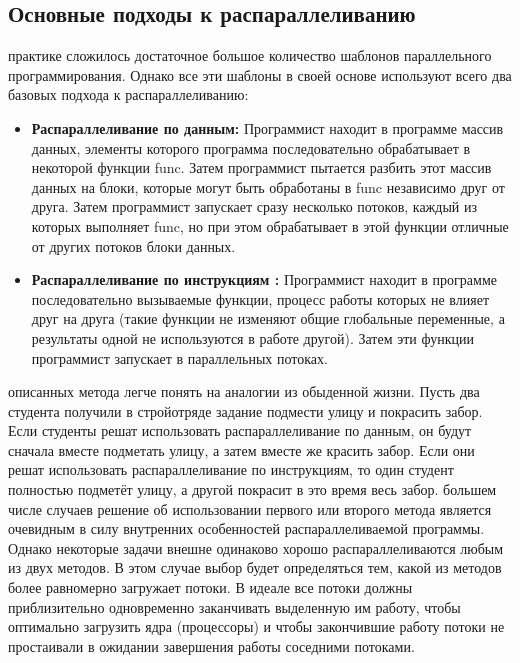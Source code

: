 { %
	\subsection{Основные подходы к распараллеливанию}
	\Large{} практике сложилось достаточное большое количество шаблонов параллельного программирования. Однако все эти шаблоны в своей основе используют всего два базовых подхода к распараллеливанию:
	\begin{itemize}
		\item\textbf{Распараллеливание по данным:} Программист находит в программе массив данных, элементы которого программа последовательно обрабатывает в некоторой функции func. Затем программист пытается разбить этот массив данных на блоки, которые могут быть обработаны в func независимо друг от друга. Затем программист запускает сразу несколько потоков, каждый из которых выполняет func, но при этом обрабатывает в этой функции отличные от других потоков блоки данных.
		\item\textbf{Распараллеливание по инструкциям :} Программист находит в программе последовательно вызываемые функции, процесс работы которых не влияет друг на друга (такие функции не изменяют общие глобальные переменные, а результаты одной не используются в работе другой). Затем эти функции программист запускает в параллельных потоках.
	\end{itemize}
	 описанных метода легче понять на аналогии из обыденной жизни. Пусть два студента получили в стройотряде задание подмести улицу и покрасить забор. Если студенты решат использовать распараллеливание по данным, он будут сначала вместе подметать улицу, а затем вместе же красить забор. Если они решат использовать распараллеливание по инструкциям, то один студент полностью подметёт улицу, а другой покрасит в это время весь забор.
	 большем числе случаев решение об использовании первого или второго метода является очевидным в силу внутренних особенностей распараллеливаемой программы. Однако некоторые задачи внешне одинаково хорошо распараллеливаются любым из двух методов. В этом случае выбор будет определяться тем, какой из методов более равномерно загружает потоки. В идеале все потоки должны приблизительно одновременно заканчивать выделенную им работу, чтобы оптимально загрузить ядра (процессоры) и чтобы закончившие работу потоки не простаивали в ожидании завершения работы соседними потоками.
	\par
}